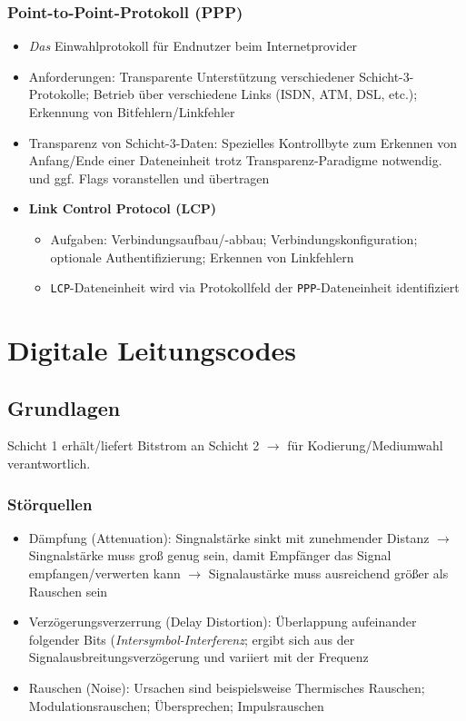 \subsubsection{Point-to-Point-Protokoll (PPP)}
\begin{itemize}
	\item \textit{Das} Einwahlprotokoll für Endnutzer beim Internetprovider
	\item Anforderungen: Transparente Unterstützung verschiedener Schicht-3-Protokolle; Betrieb über verschiedene Links (ISDN, ATM, DSL, etc.); Erkennung von Bitfehlern/Linkfehler
	\item Transparenz von Schicht-3-Daten: Spezielles Kontrollbyte zum Erkennen von Anfang/Ende einer Dateneinheit trotz Transparenz-Paradigme notwendig. und ggf. Flags voranstellen und übertragen
	\item \textbf{Link Control Protocol (LCP)}
	\begin{itemize}
		\item Aufgaben: Verbindungsaufbau/-abbau; Verbindungskonfiguration; optionale Authentifizierung; Erkennen von Linkfehlern
		\item \texttt{LCP}-Dateneinheit wird via Protokollfeld der \texttt{PPP}-Dateneinheit identifiziert
	\end{itemize}
\end{itemize}



\section{Digitale Leitungscodes}

\subsection{Grundlagen}
Schicht 1 erhält/liefert Bitstrom an Schicht 2 \(\rightarrow\) für Kodierung/Mediumwahl verantwortlich.

\subsubsection{Störquellen}
\begin{itemize}
	\item Dämpfung (Attenuation): Singnalstärke sinkt mit zunehmender Distanz \(\rightarrow\) Singnalstärke muss groß genug sein, damit Empfänger das Signal empfangen/verwerten kann \(\rightarrow\) Signalaustärke muss ausreichend größer als Rauschen sein
	\item Verzögerungsverzerrung (Delay Distortion): Überlappung aufeinander folgender Bits (\textit{Intersymbol-Interferenz}; ergibt sich aus der Signalausbreitungsverzögerung und variiert mit der Frequenz
	\item Rauschen (Noise): Ursachen sind beispielsweise Thermisches Rauschen; Modulationsrauschen; Übersprechen; Impulsrauschen
\end{itemize}

